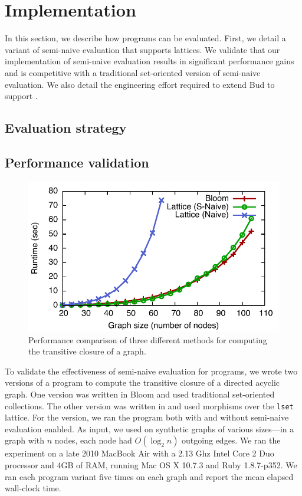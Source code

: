 \section{Implementation}
\label{sec:impl}

In this section, we describe how \lang programs can be evaluated. First, we
detail a variant of semi-naive evaluation that supports lattices. We validate
that our implementation of semi-naive evaluation results in significant
performance gains and is competitive with a traditional set-oriented version of
semi-naive evaluation. We also detail the engineering effort required to extend
Bud to support \lang. %

\subsection{Evaluation strategy}
\label{sec:lattice-eval-strat}



\subsection{Performance validation}
\label{sec:lattice-perf}

\begin{figure}[t]
\includegraphics[width=\linewidth]{fig/sn_perf}
\caption{Performance comparison of three different methods for computing the
  transitive closure of a graph.}
\label{fig:tc-perf-graph}
\end{figure}

To validate the effectiveness of semi-naive evaluation for \lang programs, we
wrote two versions of a program to compute the transitive closure of a directed
acyclic graph. One version was written in Bloom and used traditional
set-oriented collections. The other version was written in \lang and used
morphisms over the \texttt{lset} lattice. For the \lang version, we ran the
program both with and without semi-naive evaluation enabled. As input, we used
on synthetic graphs of various sizes---in a graph with $n$ nodes, each node had
$O(\log_2 n)$ outgoing edges. We ran the experiment on a late 2010
MacBook Air with a 2.13 Ghz Intel Core 2 Duo processor and 4GB of RAM, running
Mac OS X 10.7.3 and Ruby 1.8.7-p352. We ran each program variant five times on
each graph and report the mean elapsed wall-clock time.

